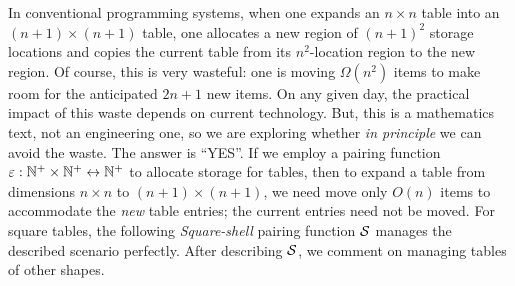 In conventional programming systems, when one expands an $n \times n$ table into an $(n+1) \times (n+1)$ table, one allocates a new region of $(n+1)^2$ storage locations and copies the current table from its $n^2$-location region to the new region.  Of course, this is very wasteful: one is moving $\Omega(n^2)$ items to make room for the anticipated $2n+1$ new items.  On any given day, the practical impact of this waste depends on current technology.  But, this is a
mathematics text, not an engineering one, so we are exploring whether {\em in principle} we can avoid the waste.  The answer is ``YES''.  If we employ a pairing function $\varepsilon: \mathbb{N}^+ \times \mathbb{N}^+ \leftrightarrow \mathbb{N}^+$ to allocate storage for tables, then to expand a table from dimensions $n \times n$ to $(n+1) \times (n+1)$, we need move only $O(n)$ items to accommodate the {\em new} table entries; the current entries need not be moved.  For square tables, the following
{\it Square-shell} pairing function $\mbox{$\cal S$}$ manages the described scenario perfectly.  After describing $\mbox{$\cal S$}$, we comment on managing tables of other shapes.
